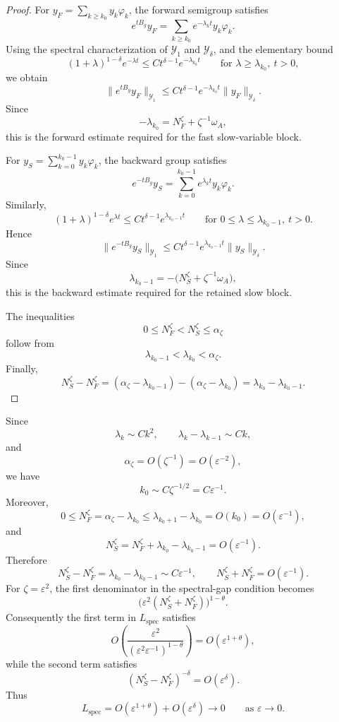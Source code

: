 \documentclass[11pt]{article}
\theoremstyle{definition}
\theoremstyle{remark}
\numberwithin{equation}{section}
\begin{document}
\begin{proof}
For \(y_F=\sum_{k\ge k_0}y_k\varphi_k\), the forward semigroup satisfies
\[
e^{tB_g}y_F
=
\sum_{k\ge k_0}e^{-\lambda_kt}y_k\varphi_k.
\]
Using the spectral characterization of \(\mathcal Y_1\) and
\(\mathcal Y_\delta\), and the elementary bound
\[
(1+\lambda)^{1-\delta}e^{-\lambda t}
\le
Ct^{\delta-1}e^{-\lambda_{k_0}t}
\qquad
\text{for }\lambda\ge\lambda_{k_0},\ t>0,
\]
we obtain
\[
\|e^{tB_g}y_F\|_{\mathcal Y_1}
\le
Ct^{\delta-1}e^{-\lambda_{k_0}t}\|y_F\|_{\mathcal Y_\delta}.
\]
Since
\[
-\lambda_{k_0}
=
N_F^\zeta+\zeta^{-1}\omega_A,
\]
this is the forward estimate required for the fast slow-variable block.

For \(y_S=\sum_{k=0}^{k_0-1}y_k\varphi_k\), the backward group satisfies
\[
e^{-tB_g}y_S
=
\sum_{k=0}^{k_0-1}e^{\lambda_kt}y_k\varphi_k.
\]
Similarly,
\[
(1+\lambda)^{1-\delta}e^{\lambda t}
\le
Ct^{\delta-1}e^{\lambda_{k_0-1}t}
\qquad
\text{for }0\le\lambda\le\lambda_{k_0-1},\ t>0.
\]
Hence
\[
\|e^{-tB_g}y_S\|_{\mathcal Y_1}
\le
Ct^{\delta-1}e^{\lambda_{k_0-1}t}\|y_S\|_{\mathcal Y_\delta}.
\]
Since
\[
\lambda_{k_0-1}
=
-\bigl(N_S^\zeta+\zeta^{-1}\omega_A\bigr),
\]
this is the backward estimate required for the retained slow block.

The inequalities
\[
0\le N_F^\zeta<N_S^\zeta\le\alpha_\zeta
\]
follow from
\[
\lambda_{k_0-1}<\lambda_{k_0}<\alpha_\zeta.
\]
Finally,
\[
N_S^\zeta-N_F^\zeta
=
(\alpha_\zeta-\lambda_{k_0-1})
-
(\alpha_\zeta-\lambda_{k_0})
=
\lambda_{k_0}-\lambda_{k_0-1}.
\]
\end{proof}
Since
\[
\lambda_k\sim Ck^2,
\qquad
\lambda_k-\lambda_{k-1}\sim Ck,
\]
and
\[
\alpha_\zeta=O(\zeta^{-1})=O(\varepsilon^{-2}),
\]
we have
\[
k_0\sim C\zeta^{-1/2}=C\varepsilon^{-1}.
\]
Moreover,
\[
0\le N_F^\zeta
=
\alpha_\zeta-\lambda_{k_0}
\le
\lambda_{k_0+1}-\lambda_{k_0}
=
O(k_0)
=
O(\varepsilon^{-1}),
\]
and
\[
N_S^\zeta
=
N_F^\zeta+\lambda_{k_0}-\lambda_{k_0-1}
=
O(\varepsilon^{-1}).
\]
Therefore
\[
N_S^\zeta-N_F^\zeta
=
\lambda_{k_0}-\lambda_{k_0-1}
\sim C\varepsilon^{-1},
\qquad
N_S^\zeta+N_F^\zeta=O(\varepsilon^{-1}).
\]
For \(\zeta=\varepsilon^2\), the first denominator in the spectral-gap
condition becomes
\[
\bigl(\varepsilon^2(N_S^\zeta+N_F^\zeta)\bigr)^{1-\theta}.
\]
Consequently the first term in \(L_{\mathrm{spec}}\) satisfies
\[
O\!\left(
\frac{\varepsilon^2}
     {(\varepsilon^2\varepsilon^{-1})^{1-\theta}}
\right)
=
O(\varepsilon^{1+\theta}),
\]
while the second term satisfies
\[
(N_S^\zeta-N_F^\zeta)^{-\delta}=O(\varepsilon^\delta).
\]
Thus
\[
L_{\mathrm{spec}}
=
O(\varepsilon^{1+\theta})+O(\varepsilon^\delta)
\longrightarrow0
\qquad\text{as }\varepsilon\to0.
\]
\end{document}
